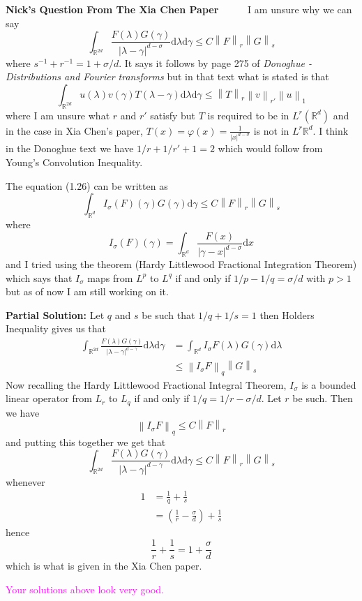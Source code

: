 \documentclass[a4paper,11pt]{article}
\numberwithin{equation}{section}
\theoremstyle{plain}
\theoremstyle{definition}
\newcommand{\ud}{\ensuremath{\mathrm{d} }}
\newcommand{\Norm}[1]{\left\|  #1   \right\|}
\newcommand{\R}{\mathbb{R}}
\newcounter{NQ}
\newenvironment{NickQuestion}[1][] %
{\refstepcounter{NQ}
	\begin{mdframed}[backgroundcolor=lightgray]\textbf{Nick's Question \theNQ \: #1~~}~~~\noindent}%
	{\end{mdframed}}
\numberwithin{NQ}{section}
\numberwithin{LQ}{section}
\numberwithin{ZQ}{section}
\begin{document}
	\begin{NickQuestion}[1.26 From The Xia Chen Paper]
		I am unsure why we can say
		\[
		\int_{\R^{2d}} \frac{F(\lambda ) G(\gamma)}{|\lambda - \gamma|^{d-\sigma}} \ud \lambda \ud \gamma \le C \Norm{F}_r \Norm{G}_s
		\]
		where $s^{-1} + r^{-1} = 1 + \sigma/d$. It says it follows by page 275 of \textit{Donoghue - Distributions and Fourier transforms} but in that text what is stated is that
		\[
		\int_{\R^{2d}} u(\lambda) v(\gamma)T(\lambda - \gamma) \ud \lambda \ud \gamma \le \Norm{T}_r \Norm{v}_{r'} \Norm{u}_1
		\]
		where I am unsure what $r$ and $r'$ satisfy but $T$ is required to be in $L^r(\R^d)$ and in the case in Xia Chen's paper, $T(x) = \varphi(x) = \frac{1}{|x|^{d-\sigma}}$ is not in $L^r{\R^d}$. I think in the Donoghue text we have $1/r + 1/{r'} + 1 = 2$ which would follow from Young's Convolution Inequality.

		The equation (1.26) can be written as
		\[
		\int_{\R^d} I_\sigma(F)(\gamma) G(\gamma) \ud \gamma \le  C \Norm{F}_r \Norm{G}_s
		\]
		where
		\[
		I_\sigma(F)(\gamma) = \int_{\R^d}\frac{F(x)}{|\gamma - x|^{d-\sigma}} \ud x
		\]
		and I tried using the theorem (Hardy Littlewood Fractional Integration Theorem) which says that $I_\sigma$ maps from $L^p$ to $L^q$ if and only if $1/p - 1/q = \sigma / d$ with $p>1$ but as of now I am still working on it.

		\textbf{Partial Solution:} Let $q$ and $s$ be such that $1/q + 1/s = 1$ then Holders Inequality gives us that
		\begin{align*}
		\int_{\R^{2d}} \frac{F(\lambda ) G(\gamma)}{|\lambda - \gamma|^{d-\gamma}} \ud \lambda \ud \gamma &=  	\int_{\R^{d}} I_\sigma F(\lambda ) G(\gamma) \ud \lambda
		\\& \le \Norm{ I_\sigma F}_q \Norm{G}_s
		\end{align*}
		Now recalling the Hardy Littlewood Fractional Integral Theorem, $I_\sigma$ is a bounded linear operator from $L_r$ to $L_q$ if and only if $1/q = 1/{r} - \sigma/d.$ Let $r$ be such. Then we have
		\[
		\Norm{I_\sigma F}_q \le C \Norm{F}_r
		\]
		and putting this together we get that
		\[
		\int_{\R^{2d}} \frac{F(\lambda ) G(\gamma)}{|\lambda - \gamma|^{d-\gamma}} \ud \lambda \ud \gamma \le C \Norm{F}_r \Norm{G}_s
		\]
		whenever
		\begin{align*}
		1 &= \frac{1}{q} + \frac{1}{s}
		\\ &=\left( \frac{1}{r} - \frac{\sigma}{d} \right) + \frac{1}{s}
		\end{align*}
		hence
		\[
		\frac{1}{r}  + \frac{1}{s} = 1 + \frac{\sigma}{d}
		\]
		which is what is given in the Xia Chen paper.
		\bigskip

		\textcolor{magenta}{Your solutions above look very good.}
	\end{NickQuestion}
\end{document}

